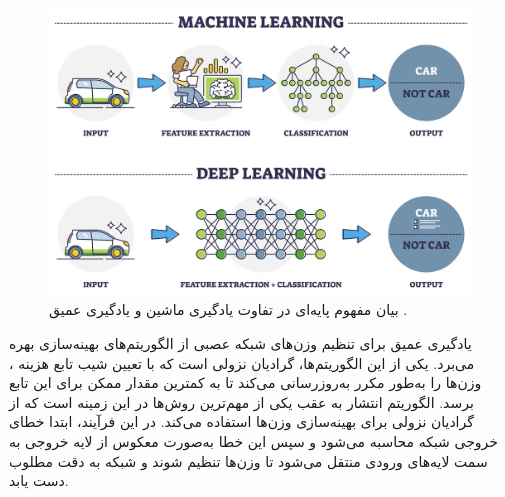 \begin{figure}[t]
	\centering
	\includegraphics[scale=0.28]{images/chap2/machine_learning_vs_deep_learning.png}%
	\caption{%
بیان مفهوم پایه‌ای در تفاوت یادگیری ماشین و یادگیری عمیق
		\cite{Suvam2024Deep}.
	}
	\label{machine_learning_vs_deep_learning}
	\centering
\end{figure}



یادگیری عمیق برای تنظیم وزن‌های شبکه عصبی از الگوریتم‌های بهینه‌سازی بهره می‌برد. یکی از این الگوریتم‌ها، گرادیان نزولی%
است که با تعیین شیب تابع هزینه%
%
، وزن‌ها را به‌طور مکرر به‌روزرسانی می‌کند تا به کمترین مقدار ممکن برای این تابع برسد. الگوریتم انتشار به عقب%
یکی از مهم‌ترین روش‌ها در این زمینه است که از گرادیان نزولی برای بهینه‌سازی وزن‌ها استفاده می‌کند. در این فرآیند، ابتدا خطای خروجی شبکه محاسبه می‌شود و سپس این خطا به‌صورت معکوس از لایه خروجی به سمت لایه‌های ورودی منتقل می‌شود تا وزن‌ها تنظیم شوند و شبکه به دقت مطلوب دست یابد.


